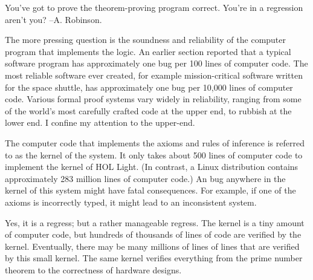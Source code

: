 \documentclass{llncs}
\begin{document}
{\narrower\it  

You've got to prove the theorem-proving program correct. You're in a regression aren't you?
--A. Robinson.

}

\smallskip

The more pressing question is the soundness and reliability of the computer program that implements the
logic.  An earlier section reported that a typical software program has approximately one
bug per 100 lines of computer code.  The most reliable software ever created, for example
mission-critical software written for the space shuttle,
has approximately one bug per 10,000 lines of computer
code.  Various formal proof systems vary widely in reliability, ranging
from some of the world's most carefully crafted code at the upper end, to
rubbish at the lower end.  I  confine my attention to the
upper-end.


The computer code that implements the axioms and rules of inference is referred to as the kernel of the system.
It only takes about
500 lines of computer code to implement the kernel of HOL Light.  
(In contrast, a Linux distribution contains approximately
283 million lines of computer code.)
An bug anywhere in the kernel of this system might have fatal consequences.  For example,
if one of the axioms  is incorrectly typed, it might lead to an inconsistent system.






Yes, it is a regress; but a rather manageable regress.  The kernel
is a tiny amount of computer code, but hundreds of thousands of lines of code  are
verified by the kernel.  Eventually, there may be many millions of lines of lines that are
verified by this small kernel.  The same kernel verifies everything from
the prime number theorem to the correctness of hardware designs.
\end{document}
